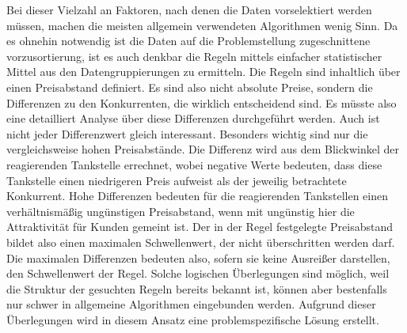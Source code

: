 Bei dieser Vielzahl an Faktoren, nach denen die Daten vorselektiert werden müssen, machen die meisten allgemein verwendeten Algorithmen wenig Sinn. Da es ohnehin notwendig ist die Daten auf die Problemstellung zugeschnittene vorzusortierung, ist es auch denkbar die Regeln mittels einfacher statistischer Mittel aus den Datengruppierungen zu ermitteln. Die Regeln sind inhaltlich über einen Preisabstand definiert. Es sind also nicht absolute Preise, sondern die Differenzen zu den Konkurrenten, die wirklich entscheidend sind. Es müsste also eine detailliert Analyse über diese Differenzen durchgeführt werden. Auch ist nicht jeder Differenzwert gleich interessant. Besonders wichtig sind nur die vergleichsweise hohen Preisabstände. Die Differenz wird aus dem Blickwinkel der reagierenden Tankstelle errechnet, wobei negative Werte bedeuten, dass diese Tankstelle einen niedrigeren Preis aufweist als der jeweilig betrachtete Konkurrent. Hohe Differenzen bedeuten für die reagierenden Tankstellen einen verhältnismäßig ungünstigen Preisabstand, wenn mit ungünstig hier die Attraktivität für Kunden gemeint ist. Der in der Regel festgelegte Preisabstand bildet also einen maximalen Schwellenwert, der nicht überschritten werden darf. Die maximalen Differenzen bedeuten also, sofern sie keine Ausreißer darstellen, den Schwellenwert der Regel. Solche logischen Überlegungen sind möglich, weil die Struktur der gesuchten Regeln bereits bekannt ist, können aber bestenfalls nur schwer in allgemeine Algorithmen eingebunden werden. Aufgrund dieser Überlegungen wird in diesem Ansatz eine problemspezifische Lösung erstellt.

